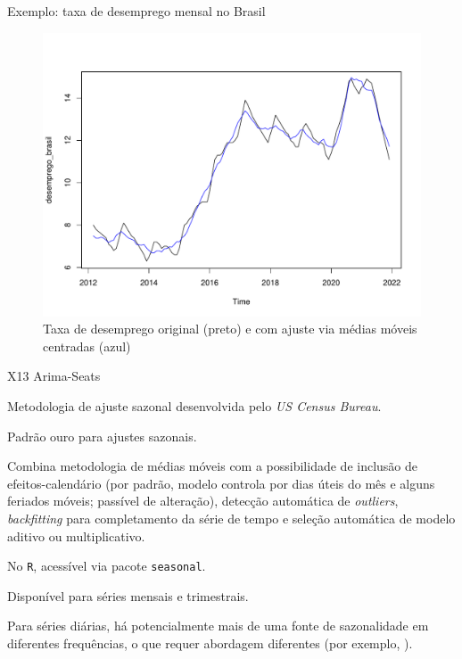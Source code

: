 \documentclass[11pt]{beamer}
\newenvironment{wideitemize}{\itemize\addtolength{\itemsep}{10pt}}{\enditemize}
\newenvironment{halfwideitemize}{\itemize\addtolength{\itemsep}{0.5em}}{\enditemize}
\begin{document}
\begin{frame}{Exemplo: taxa de desemprego mensal no Brasil}
	\begin{figure}
		\caption{Taxa de desemprego original (preto) e com ajuste via médias móveis centradas (azul)}
		\includegraphics[scale=0.4]{graficos/desemprego_mm.pdf}
	\end{figure}
\end{frame}

\begin{frame}{X13 Arima-Seats}
	\begin{wideitemize}
		\item Metodologia de ajuste sazonal desenvolvida pelo \textit{US Census Bureau}.
		\item Padrão ouro para ajustes sazonais.
		\begin{halfwideitemize}
			\item Combina metodologia de médias móveis com a possibilidade de inclusão de efeitos-calendário (por padrão, modelo controla por dias úteis do mês e alguns feriados móveis; passível de alteração), detecção automática de \textit{outliers}, \textit{backfitting} para completamento da série de tempo e seleção automática de modelo aditivo ou multiplicativo. 
		\end{halfwideitemize}
				\item No \texttt{R}, acessível via pacote \texttt{seasonal}.
		\item Disponível para séries mensais e trimestrais.
		\begin{halfwideitemize}
			\item Para séries diárias, há potencialmente mais de uma fonte de sazonalidade em diferentes frequências, o que requer abordagem diferentes (por exemplo, \cite{DeLivera2012}).
		\end{halfwideitemize}
	\end{wideitemize}
\end{frame}
\end{document}
